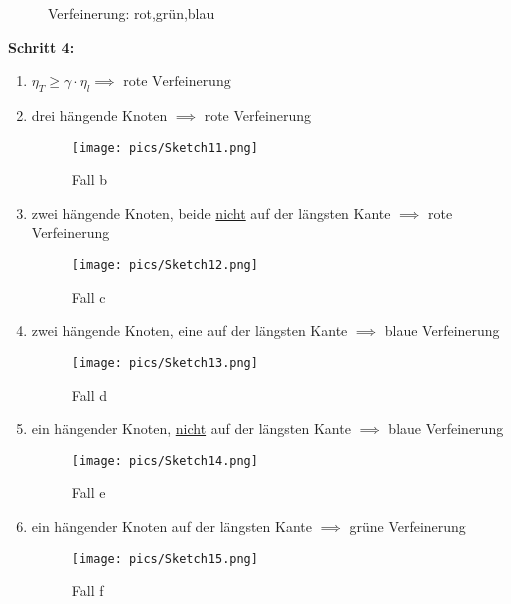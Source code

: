 \begin{figure}[H]
	\center
	
	\caption{Verfeinerung: rot,grün,blau}
	\label{AbbRefinement_types}
\end{figure}

\textbf{Schritt 4:}
\begin{enumerate}[label=\alph*)]
	\item $\eta_T\geq\gamma\cdot\eta_l\implies\text{ rote Verfeinerung}$
	\item drei hängende Knoten $\implies$ rote Verfeinerung
	\begin{figure}[!ht]
		\begin{center}
			\texttt{[image: pics/Sketch11.png]}
			\caption{Fall b}
			\label{AbbVerfeinerungB}
		\end{center}
	\end{figure}
	\item zwei hängende Knoten, beide \underline{nicht} auf der längsten Kante $\implies$ rote Verfeinerung
	\begin{figure}[!ht]
		\begin{center}
			\texttt{[image: pics/Sketch12.png]}
			\caption{Fall c}
			\label{AbbVerfeinerungC}
		\end{center}
	\end{figure}
	\item zwei hängende Knoten, eine auf der längsten Kante $\implies$ blaue Verfeinerung
	\begin{figure}[!ht]
		\begin{center}
			\texttt{[image: pics/Sketch13.png]}
			\caption{Fall d}
			\label{AbbVerfeinerungD}
		\end{center}
	\end{figure}
	\item ein hängender Knoten, \underline{nicht} auf der längsten Kante $\implies$ blaue Verfeinerung
	\begin{figure}[!ht]
		\begin{center}
			\texttt{[image: pics/Sketch14.png]}
			\caption{Fall e}
			\label{AbbVerfeinerungE}
		\end{center}
	\end{figure}
	\item ein hängender Knoten auf der längsten Kante $\implies$ grüne Verfeinerung
	\begin{figure}[!ht]
		\begin{center}
			\texttt{[image: pics/Sketch15.png]}
			\caption{Fall f}
			\label{AbbVerfeinerungF}
		\end{center}
	\end{figure}
\end{enumerate}

